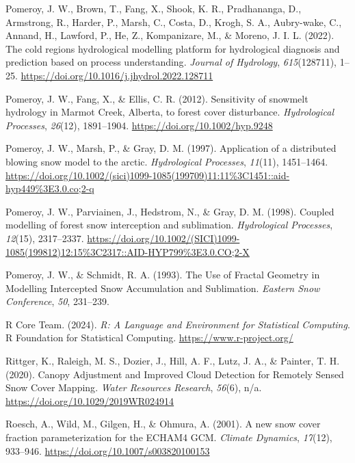 \documentclass[
  letterpaper,
  DIV=11,
  numbers=noendperiod]{scrartcl}
\newlength{\cslhangindent}
\newenvironment{CSLReferences}[2] %
 {\begin{list}{}{%
  \setlength{\itemindent}{0pt}
  \setlength{\leftmargin}{0pt}
  \setlength{\parsep}{0pt}
  \ifodd #1
   \setlength{\leftmargin}{\cslhangindent}
   \setlength{\itemindent}{-1\cslhangindent}
  \fi
  \setlength{\itemsep}{#2\baselineskip}}}
 {\end{list}}
\begin{document}
\begin{CSLReferences}{1}{0}
Pomeroy, J. W., Brown, T., Fang, X., Shook, K. R., Pradhananga, D.,
Armstrong, R., Harder, P., Marsh, C., Costa, D., Krogh, S. A.,
Aubry-wake, C., Annand, H., Lawford, P., He, Z., Kompanizare, M., \&
Moreno, J. I. L. (2022). {The cold regions hydrological modelling
platform for hydrological diagnosis and prediction based on process
understanding}. \emph{Journal of Hydrology}, \emph{615}(128711), 1--25.
\url{https://doi.org/10.1016/j.jhydrol.2022.128711}

Pomeroy, J. W., Fang, X., \& Ellis, C. R. (2012). {Sensitivity of
snowmelt hydrology in Marmot Creek, Alberta, to forest cover
disturbance}. \emph{Hydrological Processes}, \emph{26}(12), 1891--1904.
\url{https://doi.org/10.1002/hyp.9248}

Pomeroy, J. W., Marsh, P., \& Gray, D. M. (1997). {Application of a
distributed blowing snow model to the arctic}. \emph{Hydrological
Processes}, \emph{11}(11), 1451--1464.
\url{https://doi.org/10.1002/(sici)1099-1085(199709)11:11\%3C1451::aid-hyp449\%3E3.0.co;2-q}

Pomeroy, J. W., Parviainen, J., Hedstrom, N., \& Gray, D. M. (1998).
{Coupled modelling of forest snow interception and sublimation}.
\emph{Hydrological Processes}, \emph{12}(15), 2317--2337.
\url{https://doi.org/10.1002/(SICI)1099-1085(199812)12:15\%3C2317::AID-HYP799\%3E3.0.CO;2-X}

Pomeroy, J. W., \& Schmidt, R. A. (1993). {The Use of Fractal Geometry
in Modelling Intercepted Snow Accumulation and Sublimation}.
\emph{Eastern Snow Conference}, \emph{50}, 231--239.

R Core Team. (2024). \emph{{R: A Language and Environment for
Statistical Computing}}. R Foundation for Statistical Computing.
\url{https://www.r-project.org/}

Rittger, K., Raleigh, M. S., Dozier, J., Hill, A. F., Lutz, J. A., \&
Painter, T. H. (2020). {Canopy Adjustment and Improved Cloud Detection
for Remotely Sensed Snow Cover Mapping}. \emph{Water Resources
Research}, \emph{56}(6), n/a. \url{https://doi.org/10.1029/2019WR024914}

Roesch, A., Wild, M., Gilgen, H., \& Ohmura, A. (2001). {A new snow
cover fraction parameterization for the ECHAM4 GCM}. \emph{Climate
Dynamics}, \emph{17}(12), 933--946.
\url{https://doi.org/10.1007/s003820100153}


\end{CSLReferences}
\end{document}
